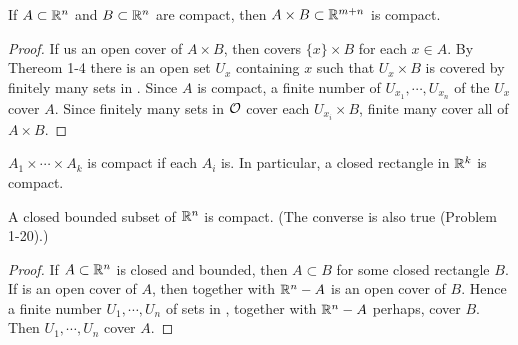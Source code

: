 \begin{corollary}
    If $A\subset \mathbb{R}^n$ and $B\subset \mathbb{R}^n$ are compact, then 
    $A\times B\subset \mathbb{R}^{m+n}$ is compact. 
\end{corollary}

\begin{proof}
    If  us an open cover of $A\times B$, then  covers $\{x\}\times B$ 
    for each $x\in A$. By Thereom 1-4 there is an open set $U_x$ containing 
    $x$ such that $U_x\times B$ is covered by finitely many sets in .
    Since $A$ is compact, a finite number of $U_{x_1}, \cdots, U_{x_n}$ of 
    the $U_x$ cover $A$. Since finitely many sets in $\mathcal{O}$ cover each $U_{x_i}\times B$,
    finite many cover all of $A\times B$. 
\end{proof}

\begin{corollary}
    $A_1\times \cdots\times A_k$ is compact if each $A_i$ is.
    In particular, a closed rectangle in $\mathbb{R}^k$ is compact. 
\end{corollary}

\begin{corollary}
    A closed bounded subset of $\mathbb{R}^n$ is compact. (The converse is also true (Problem 1-20).)
\end{corollary}

\begin{proof}
    If $A \subset \mathbb{R}^n$ is closed and bounded, then $A \subset B$ for
    some closed rectangle $B$. If  is an open cover of $A$, then 
    together with $\mathbb{R}^n-A$ is an open cover of $B$. Hence a finite
    number $U_1, \cdots , U_n$ of sets in , together 
    with $\mathbb{R}^n-A$ perhaps, cover $B$. Then $U_1, \cdots, U_n$ cover $A$. 
\end{proof}

